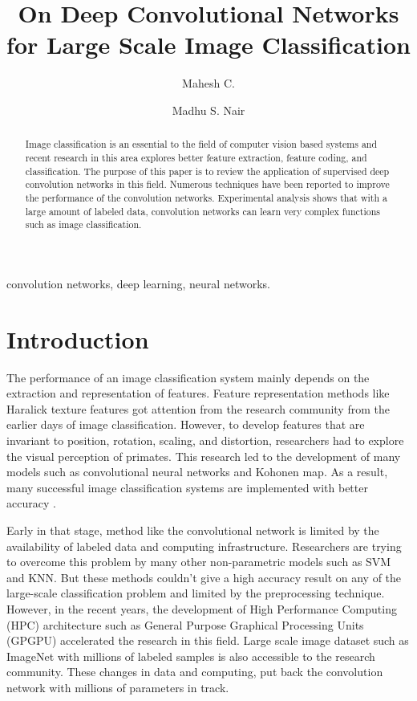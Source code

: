 \documentclass{llncs}
\title { On Deep Convolutional Networks for Large Scale Image Classification}
\author{Mahesh C. \and  Madhu S. Nair }
\institute{Department of Computer Science, University of Kerala, Kariavattom\\ Thiruvananthapuram-695581,
	Kerala, India.}
\begin{document}
%
\maketitle
%
\begin{abstract}
Image classification is an essential to the field of computer vision  based systems and recent research in this area explores better feature extraction, feature coding, and classification.  The purpose of this paper is to review the application of supervised  deep convolution networks in this field. Numerous techniques have been reported to improve the performance of the convolution networks. Experimental analysis shows that with a large amount of labeled data, convolution networks can learn very complex functions such as image classification. 



\end{abstract}
%
\begin{keywords}
convolution networks, deep learning, neural networks.
\end{keywords}
%
\section{Introduction}
\label{sec:intro}
The performance of an  image  classification system mainly depends on the  extraction and  representation of features.  Feature representation methods like Haralick texture features \cite{Haralick1973} got attention from the research community from the earlier days of  image classification. However, to develop features that are invariant to position, rotation, scaling, and distortion, researchers had  to  explore the visual perception of primates. This research  led to  the development of many models such as convolutional neural networks\cite{LeCun1998} and  Kohonen map\cite{kohonen1982self}. 
As a result, many successful image classification systems are  implemented with better accuracy \cite{lecun-89e}.

Early in that stage, method like the convolutional network is limited by the  availability of labeled  data and computing infrastructure. Researchers are trying to overcome  this problem by many other non-parametric models such as SVM and KNN. But these methods couldn't give a high accuracy result  on any of the large-scale classification problem  and limited by the preprocessing technique.  However, in the recent years, the development of  High Performance Computing (HPC) architecture such as General Purpose Graphical Processing Units (GPGPU)  accelerated the research in this field. Large scale image  dataset such as ImageNet \cite{imagenet}  with  millions of labeled samples is also accessible to the research community. These changes in data and computing, put back the convolution network with millions of parameters in track. 
\end{document}
